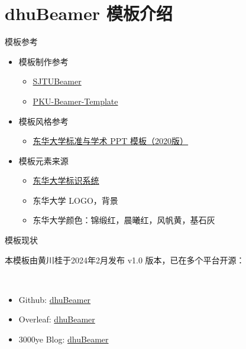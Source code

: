 \documentclass[12pt]{beamer}
\begin{document}
\section{dhuBeamer 模板介绍}
\begin{frame}{模板参考}

    \begin{itemize}
        \item 模板制作参考
        \begin{itemize}
            \item \href{https://github.com/sjtug/SJTUBeamer}{SJTUBeamer}
            \item \href{https://www.overleaf.com/latex/templates/bei-da-zhong-wen-mo-ban-pku-beamer-template/kfxpbtzrqhrn}{PKU-Beamer-Template}
        \end{itemize}
        \item 模板风格参考
        \begin{itemize}
            \item \href{https://www.dhu.edu.cn/_upload/article/files/d2/8c/2137ec0c44238fd6fbd3ee28ff07/9f9b566a-67f1-4717-991f-477ee5b43acb.zip}{东华大学标准与学术 PPT 模板（2020版）}
        \end{itemize}
        \item 模板元素来源
        \begin{itemize}
            \item \href{https://www.dhu.edu.cn/bsxt/listm.htm}{东华大学标识系统}
            \item 东华大学 LOGO，背景
            \item 东华大学颜色：锦缎红，晨曦红，风帆黄，基石灰
        \end{itemize}
    \end{itemize}

\end{frame}

\begin{frame}{模板现状}

    本模板由黄川桂于2024年2月发布 v1.0 版本，已在多个平台开源：

    ~\par

    \begin{itemize}
        \item Github: \href{https://github.com/3000ye/dhuBeamer}{dhuBeamer}
        \item Overleaf: \href{https://www.overleaf.com/latex/templates/dong-hua-da-xue-dhubeamer-mo-ban/wfqjdyjjnswr}{dhuBeamer}
        \item 3000ye Blog: \href{https://3000ye.com/p/dhubeamer/}{dhuBeamer}
    \end{itemize}

\end{frame}
\end{document}
